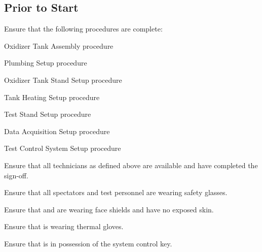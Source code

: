 \newpage
\subsection{Prior to Start}
\begin{checklist}
    \item Ensure that the following procedures are complete:
    \begin{checklist}
        \item Oxidizer Tank Assembly procedure
        \item Plumbing Setup procedure
        \item Oxidizer Tank Stand Setup procedure
        \item Tank Heating Setup procedure
        \item Test Stand Setup procedure
        \item Data Acquisition Setup procedure
        \item Test Control System Setup procedure
    \end{checklist}
    \item Ensure that all technicians as defined above are available and have completed the sign-off.
    \item Ensure that all spectators and test personnel are wearing safety glasses.
    \item Ensure that \primary{} and \secondary{} are wearing face shields and have no exposed skin.
    \item Ensure that \primary{} is wearing thermal gloves.
    \item Ensure that \ops{} is in possession of the system control key.
\end{checklist}
\setcounter{checklistnum}{0}

\newpage
